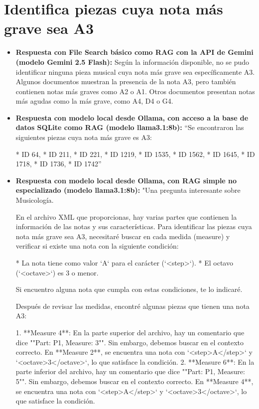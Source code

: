 \section{Identifica piezas cuya nota más grave sea A3}
\begin{itemize}
    \item \textbf{Respuesta con File Search básico como RAG con la API de Gemini (modelo Gemini 2.5 Flash):} Según la información disponible, no se pudo identificar ninguna pieza musical cuya nota más grave sea específicamente A3. Algunos documentos muestran la presencia de la nota A3, pero también contienen notas más graves como A2 o A1. Otros documentos presentan notas más agudas como la más grave, como A4, D4 o G4.
    \item \textbf{Respuesta con modelo local desde Ollama, con acceso a la base de datos SQLite como RAG (modelo llama3.1:8b):} ``Se encontraron las siguientes piezas cuya nota más grave es A3:

* ID 64,
* ID 211,
* ID 221,
* ID 1219,
* ID 1535,
* ID 1562,
* ID 1645,
* ID 1718,
* ID 1736,
* ID 1742''
\item \textbf{Respuesta con modelo local desde Ollama, con RAG simple no especializado (modelo llama3.1:8b):} "Una pregunta interesante sobre Musicología.

En el archivo XML que proporcionas, hay varias partes que contienen la información de las notas y sus características. Para identificar las piezas cuya nota más grave sea A3, necesitaré buscar en cada medida (measure) y verificar si existe una nota con la siguiente condición:

* La nota tiene como valor `A` para el carácter (`<step>`).
* El octavo (`<octave>`) es 3 o menor.

Si encuentro alguna nota que cumpla con estas condiciones, te lo indicaré.

Después de revisar las medidas, encontré algunas piezas que tienen una nota A3:

1. **Measure 4**: En la parte superior del archivo, hay un comentario que dice ""Part: P1, Measure: 3"". Sin embargo, debemos buscar en el contexto correcto. En **Measure 2**, se encuentra una nota con `<step>A</step>` y `<octave>3</octave>`, lo que satisface la condición.
2. **Measure 6**: En la parte inferior del archivo, hay un comentario que dice ""Part: P1, Measure: 5"". Sin embargo, debemos buscar en el contexto correcto. En **Measure 4**, se encuentra una nota con `<step>A</step>` y `<octave>3</octave>`, lo que satisface la condición.


\end{itemize}
